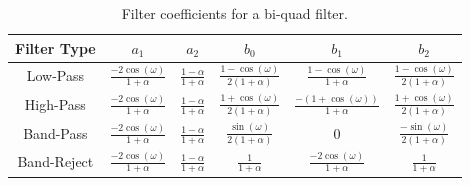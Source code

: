 \documentclass[12pt,twoside]{report}
\begin{document}
\begin{table}[h!]

  \centering

  \renewcommand{\arraystretch}{3}
  \begin{tabular}[]{ | c | c | c | c | c | c |}
    \hline
    \rowcolor[gray]{0.8}
    Filter Type & $a_{1}$ & $a_{2}$ & $b_{0}$ & $b_{1}$ & $b_{2}$ \\\hline
    Low-Pass & $\frac{-2\cos(\omega)}{1 + \alpha}$ & $\frac{1 - \alpha}{1 + \alpha}$ & $\frac{1-\cos(\omega)}{2(1 + \alpha)}$ & $\frac{1-\cos(\omega)}{1 + \alpha}$ & $\frac{1-\cos(\omega)}{2(1 + \alpha)}$\\\hline
    High-Pass & $\frac{-2\cos(\omega)}{1 + \alpha}$ & $\frac{1 - \alpha}{1 + \alpha}$ & $\frac{1+\cos(\omega)}{2(1 + \alpha)}$ & $\frac{-(1+\cos(\omega))}{1 + \alpha}$ & $\frac{1+\cos(\omega)}{2(1 + \alpha)}$\\\hline
    Band-Pass & $\frac{-2\cos(\omega)}{1 + \alpha}$ & $\frac{1 - \alpha}{1 + \alpha}$ & $\frac{\sin(\omega)}{2(1 + \alpha)}$ & $0$ & $\frac{-\sin(\omega)}{2(1 + \alpha)}$\\\hline
    Band-Reject & $\frac{-2\cos(\omega)}{1 + \alpha}$ & $\frac{1 - \alpha}{1 + \alpha}$ & $\frac{1}{1 + \alpha}$ & $\frac{-2\cos(\omega)}{1 + \alpha}$ & $\frac{1}{1 + \alpha}$\\
    \hline
  \end{tabular}

  \caption{Filter coefficients for a bi-quad filter.}

  \label{tb:coef}

\end{table}
\end{document}
